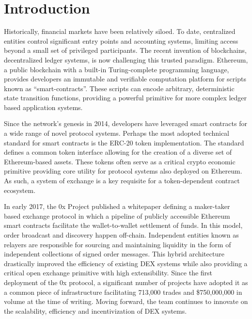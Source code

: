 \documentclass[10pt]{article}
\begin{document}

\tableofcontents
\pagebreak


\section{Introduction}\label{intro}
Historically, financial markets have been relatively siloed. To date, centralized entities control significant entry points and accounting systems, limiting access beyond a small set of privileged participants\cite{capital-markets-report}. The recent invention of blockchains, decentralized ledger systems, is now challenging this trusted paradigm. Ethereum, a public blockchain with a built-in Turing-complete programming language, provides developers an immutable and verifiable computation platform for scripts known as “smart-contracts”. These scripts can encode arbitrary, deterministic state transition functions, providing a powerful primitive for more complex ledger based application systems\cite{ethereum-whitepaper}.
\medskip

Since the network’s genesis in 2014, developers have leveraged smart contracts for a wide range of novel protocol systems. Perhaps the most adopted technical standard for smart contracts is the ERC-20 token implementation\cite{erc-20}. The standard defines a common token interface allowing for the creation of a diverse set of Ethereum-based assets. These tokens often serve as a critical crypto economic primitive providing core utility for protocol systems also deployed on Ethereum. As such, a system of exchange is a key requisite for a token-dependent contract ecosystem.
\medskip

In early 2017, the 0x Project published a whitepaper defining a maker-taker based exchange  protocol in which a pipeline of publicly accessible Ethereum smart contracts facilitate the wallet-to-wallet settlement of funds. In this model, order broadcast and discovery happen off-chain. Independent entities known as relayers are responsible for sourcing and maintaining liquidity in the form of independent collections of signed order messages. This hybrid architecture drastically improved the efficiency of existing DEX systems while also providing a critical open exchange primitive with high extensibility\cite{0x-wp}. Since the first deployment of the 0x protocol, a significant number of projects have adopted it as a common piece of infrastructure facilitating 713,000 trades and \$750,000,000 in volume at the time of writing. Moving forward, the team continues to innovate on the scalability, efficiency and incentivization of DEX systems.
\medskip
\end{document}
